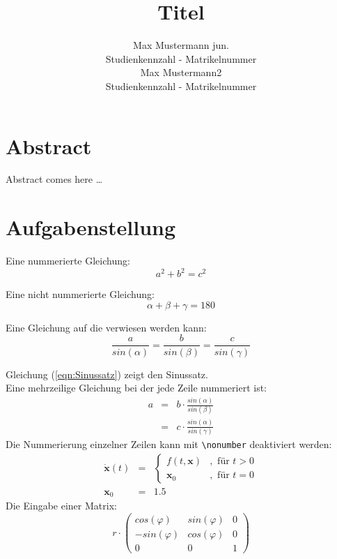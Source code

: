 \documentclass[a4paper,11pt]{scrartcl}
\newcommand{\p}{\varphi}
\newcommand{\al}{\alpha}
\newcommand{\be}{\beta}
\newcommand{\g}{\gamma}
\begin{document}
\subject{Lehrveranstaltungstitel}
\title{Titel\\}

\publishers{Betreuer: Max Mustermann }
\author{
Max Mustermann jun.\\
Studienkennzahl - Matrikelnummer\\
Max Mustermann2\\
Studienkennzahl - Matrikelnummer}
\maketitle

\section*{Abstract}

Abstract comes here \dots

\newpage

\tableofcontents

\newpage

\section{Aufgabenstellung}

Eine nummerierte Gleichung:
\begin{equation}
 a^2 + b^2 = c^2
\end{equation}

Eine nicht nummerierte Gleichung:
\begin{equation*}
 \al + \be + \g = 180
\end{equation*}

Eine Gleichung auf die verwiesen werden kann:
\begin{equation}
\label{eqn:Sinussatz}
 \frac{a}{sin(\al)} = \frac{b}{sin(\be)} = \frac{c}{sin(\g)}
\end{equation}

Gleichung (\ref{eqn:Sinussatz}) zeigt den Sinussatz.\\

\noindent
Eine mehrzeilige Gleichung bei der jede Zeile nummeriert ist:
\begin{eqnarray}
  a &=& b\cdot \frac{sin(\al)}{sin(\be)} \\
    &=& c\cdot \frac{sin(\al)}{sin(\g)}
\end{eqnarray}
Die Nummerierung einzelner Zeilen kann mit \verb|\nonumber| deaktiviert werden:
\begin{eqnarray}
 \dot{\mathbf{x}}(t) &=& \begin{cases}
                         f(t,\mathbf{x}) &, \text{ für } t>0 \\
                         \mathbf{x}_0 &, \text{ für } t=0
                       \end{cases} \\
 \mathbf{x}_0 &=& 1.5 \nonumber
\end{eqnarray}
Die Eingabe einer Matrix:
$$ r\cdot
\begin{pmatrix}
 cos(\p) & sin(\p) & 0 \\
 -sin(\p) & cos(\p) & 0 \\
 0 & 0 & 1
\end{pmatrix}
$$
\end{document}
